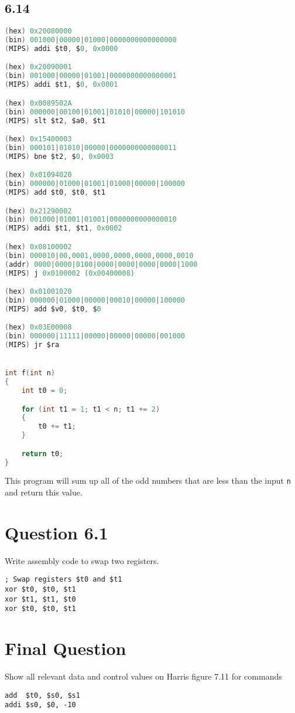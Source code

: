 \documentclass[11pt]{article}
\def\code#1{\texttt{#1}}
\begin{document}
\subsection*{6.14}
\begin{lstlisting}[language=C]
(hex) 0x20080000
(bin) 001000|00000|01000|0000000000000000
(MIPS) addi $t0, $0, 0x0000

(hex) 0x20090001 
(bin) 001000|00000|01001|0000000000000001
(MIPS) addi $t1, $0, 0x0001

(hex) 0x0089502A
(bin) 000000|00100|01001|01010|00000|101010
(MIPS) slt $t2, $a0, $t1

(hex) 0x15400003
(bin) 000101|01010|00000|0000000000000011
(MIPS) bne $t2, $0, 0x0003

(hex) 0x01094020
(bin) 000000|01000|01001|01000|00000|100000
(MIPS) add $t0, $t0, $t1

(hex) 0x21290002
(bin) 001000|01001|01001|0000000000000010
(MIPS) addi $t1, $t1, 0x0002

(hex) 0x08100002
(bin) 000010|00,0001,0000,0000,0000,0000,0010
(addr) 0000|0000|0100|0000|0000|0000|0000|1000
(MIPS) j 0x0100002 (0x00400008)

(hex) 0x01001020
(bin) 000000|01000|00000|00010|00000|100000
(MIPS) add $v0, $t0, $0

(hex) 0x03E00008
(bin) 000000|11111|00000|00000|00000|001000
(MIPS) jr $ra


int f(int n)
{
    int t0 = 0;

    for (int t1 = 1; t1 < n; t1 += 2)
    {
        t0 += t1;
    }

    return t0;
}

\end{lstlisting}

This program will sum up all of the odd numbers that are less
than the input \code{n} and return this value.

\section*{Question 6.1}
Write assembly code to swap two registers.

\begin{lstlisting}
; Swap registers $t0 and $t1
xor $t0, $t0, $t1
xor $t1, $t1, $t0
xor $t0, $t0, $t1
\end{lstlisting}

\section*{Final Question}
Show all relevant data and control values on Harris figure 7.11 for commands
\begin{lstlisting}
add  $t0, $s0, $s1
addi $s0, $0, -10
\end{lstlisting}
\end{document}
